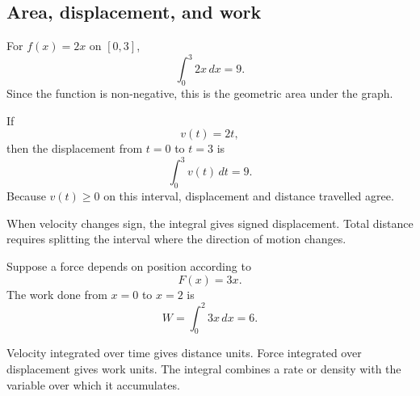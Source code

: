 \subsection{Area, displacement, and work}

\begin{examplebox}
For $f(x)=2x$ on $[0,3]$,
\[
\int_0^3 2x\,dx=9.
\]
Since the function is non-negative, this is the geometric area under the graph.
\end{examplebox}

\begin{examplebox}
If
\[
v(t)=2t,
\]
then the displacement from $t=0$ to $t=3$ is
\[
\int_0^3 v(t)\,dt=9.
\]
Because $v(t)\ge0$ on this interval, displacement and distance travelled agree.
\end{examplebox}

\begin{remarkbox}
When velocity changes sign, the integral gives signed displacement. Total distance requires splitting the interval where the direction of motion changes.
\end{remarkbox}

\begin{examplebox}
Suppose a force depends on position according to
\[
F(x)=3x.
\]
The work done from $x=0$ to $x=2$ is
\[
W=\int_0^2 3x\,dx=6.
\]
\end{examplebox}

\begin{interpretationbox}
Velocity integrated over time gives distance units. Force integrated over displacement gives work units. The integral combines a rate or density with the variable over which it accumulates.
\end{interpretationbox}
